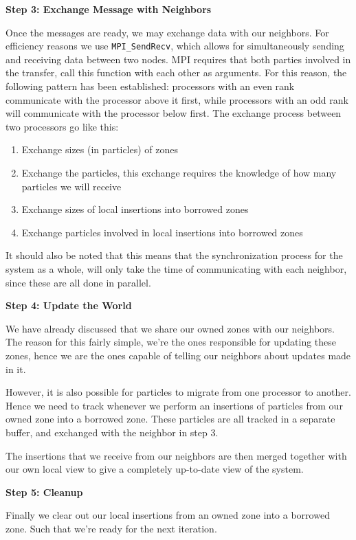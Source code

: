 \textbf{Step 3: Exchange Message with Neighbors}

Once the messages are ready, we may exchange data with our neighbors. For efficiency reasons we use \verb!MPI_SendRecv!,
which allows for simultaneously sending and receiving data between two nodes. MPI requires that both parties involved in
the transfer, call this function with each other as arguments. For this reason, the following pattern has been
established: processors with an even rank communicate with the processor above it first, while processors with an odd
rank will communicate with the processor below first. The exchange process between two processors go like this:

\begin{enumerate}
	\item Exchange sizes (in particles) of zones
	\item Exchange the particles, this exchange requires the knowledge of how many particles we will receive
	\item Exchange sizes of local insertions into borrowed zones
	\item Exchange particles involved in local insertions into borrowed zones
\end{enumerate}

It should also be noted that this means that the synchronization process for the system as a whole, will only take the
time of communicating with each neighbor, since these are all done in parallel.

\textbf{Step 4: Update the World}

We have already discussed that we share our owned zones with our neighbors. The reason for this fairly simple, we're the
ones responsible for updating these zones, hence we are the ones capable of telling our neighbors about updates made in
it.

However, it is also possible for particles to migrate from one processor to another. Hence we need to track whenever we
perform an insertions of particles from our owned zone into a borrowed zone. These particles are all tracked in a
separate buffer, and exchanged with the neighbor in step 3.

The insertions that we receive from our neighbors are then merged together with our own local view to give a completely
up-to-date view of the system.

\textbf{Step 5: Cleanup}

Finally we clear out our local insertions from an owned zone into a borrowed zone. Such that we're ready for the next 
iteration.

